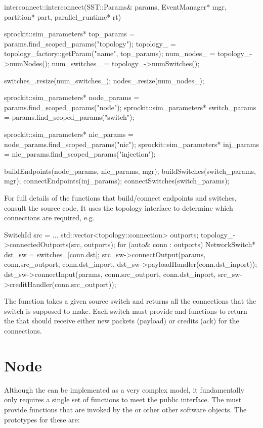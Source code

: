 \begin{CppCode}
interconnect::interconnect(SST::Params& params, EventManager* mgr, 
	partition* part, parallel_runtime* rt)
{
  sprockit::sim_parameters* top_params = params.find_scoped_params("topology");
  topology_ = topology_factory::getParam("name", top_params);
  num_nodes_ = topology_->numNodes();
  num_switches_ = topology_->numSwitches();
  
  switches_.resize(num_switches_);
  nodes_.resize(num_nodes_);

  sprockit::sim_parameters* node_params = params.find_scoped_params("node");
  sprockit::sim_parameters* switch_params = params.find_scoped_params("switch");
  
  sprockit::sim_parameters* nic_params = node_params.find_scoped_params("nic");
  sprockit::sim_parameters* inj_params = nic_params.find_scoped_params("injection");
  
  buildEndpoints(node_params, nic_params, mgr);
  buildSwitches(switch_params, mgr);
  connectEndpoints(inj_params);
  connectSwitches(switch_params); 
}
\end{CppCode}

For full details of the functions that build/connect endpoints and switches, consult the source code.
It uses the topology interface to determine which connections are required, e.g.

\begin{CppCode}
SwitchId src = ...
std::vector<topology::connection> outports;
topology_->connectedOutports(src, outports);
for (auto& conn : outports){
  NetworkSwitch* dst_sw = switches_[conn.dst];
  src_sw->connectOutput(params, conn.src_outport, conn.dst_inport,
  					 dst_sw->payloadHandler(conn.dst_inport));
  dst_sw->connectInput(params, conn.src_outport, conn.dst_inport,
  				       src_sw->creditHandler(conn.src_outport));
}
\end{CppCode}
The  function takes a given source switch and returns all the connections that the
switch is supposed to make.  Each switch must provide  and  functions to return
the  that should receive either new packets (payload) or credits (ack) for the connections.

\section{Node}\label{sec:node}
Although the \nodecls can be implemented as a very complex model, it fundamentally only requires a single set of functions to meet the public interface.
The \nodecls must provide  functions that are invoked by the  or other other software objects.
The prototypes for these are:

